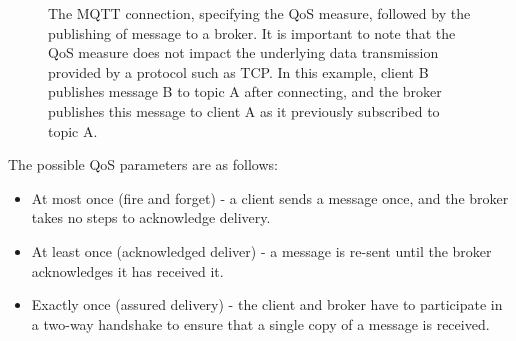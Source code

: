 \begin{figure}[ht]
\begin{center}
        \caption{The MQTT connection, specifying the QoS measure, followed by the publishing of message to a broker. It is important to note that the QoS measure does not impact the underlying data transmission provided by a protocol such as TCP. In this example, client B publishes message B to topic A after connecting, and the broker publishes this message to client A as it previously subscribed to topic A.}
        \label{fig:mqtt}
    \end{center}
\end{figure}

The possible QoS parameters are as follows:

\begin{itemize}
    \item At most once (fire and forget) - a client sends a message once, and the broker takes no steps to acknowledge delivery.
    \item At least once (acknowledged deliver) - a message is re-sent until the broker acknowledges it has received it.
    \item Exactly once (assured delivery) - the client and broker have to participate in a two-way handshake to ensure that a single copy of a message is received.
\end{itemize}

